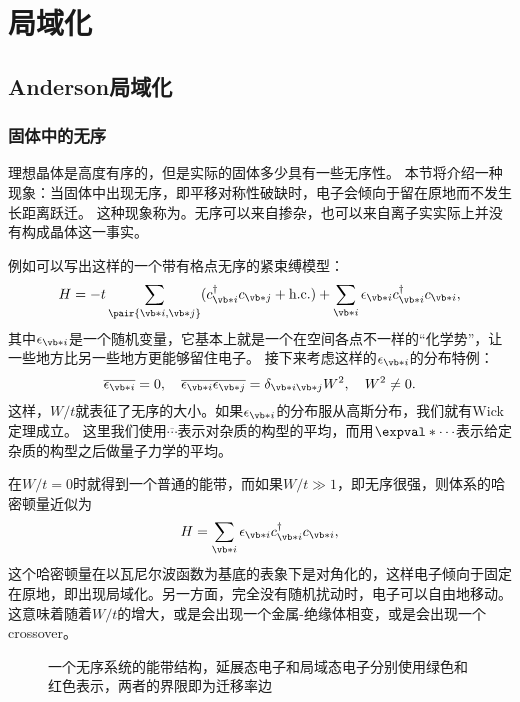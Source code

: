 \chapter{局域化}

\section{Anderson局域化}

\subsection{固体中的无序}

理想晶体是高度有序的，但是实际的固体多少具有一些无序性。
本节将介绍一种现象：当固体中出现无序，即平移对称性破缺时，电子会倾向于留在原地而不发生长距离跃迁。
这种现象称为。无序可以来自掺杂，也可以来自离子实实际上并没有构成晶体这一事实。

例如可以写出这样的一个带有格点无序的紧束缚模型：
\begin{equation}
    {H} = - t \sum_{\pair{\vb*{i}, \vb*{j}}} ({c}_{\vb*{i}}^\dagger {c}_{\vb*{j}} + \text{h.c.}) + \sum_{\vb*{i}} \epsilon_{\vb*{i}} {c}_{\vb*{i}}^\dagger {c}_{\vb*{i}},
    \label{eq:tight-binding-with-disorder}
\end{equation}
其中$\epsilon_{\vb*{i}}$是一个随机变量，它基本上就是一个在空间各点不一样的“化学势”，让一些地方比另一些地方更能够留住电子。
接下来考虑这样的$\epsilon_{\vb*{i}}$的分布特例：
\begin{equation}
    \overline{\epsilon_{\vb*{i}}} = 0, \quad \overline{\epsilon_{\vb*{i}} \epsilon_{\vb*{j}}} = \delta_{\vb*{i} \vb*{j}} W^2 , \quad W^2 \neq 0.
\end{equation}
这样，$W/t$就表征了无序的大小。如果$\epsilon_{\vb*{i}}$的分布服从高斯分布，我们就有Wick定理成立。
这里我们使用$\overline{\cdots}$表示对杂质的构型的平均，而用$\expval*{\cdots}$表示给定杂质的构型之后做量子力学的平均。

在$W/t=0$时就得到一个普通的能带，而如果$W/t \gg 1$，即无序很强，则体系的哈密顿量近似为
\[
    {H} = \sum_{\vb*{i}} \epsilon_{\vb*{i}} {c}_{\vb*{i}}^\dagger {c}_{\vb*{i}},
\]
这个哈密顿量在以瓦尼尔波函数为基底的表象下是对角化的，这样电子倾向于固定在原地，即出现局域化。另一方面，完全没有随机扰动时，电子可以自由地移动。
这意味着随着$W/t$的增大，或是会出现一个金属-绝缘体相变，或是会出现一个crossover。

\begin{figure}
    \centering
    
    \caption{一个无序系统的能带结构，延展态电子和局域态电子分别使用绿色和红色表示，两者的界限即为迁移率边}
    \label{fig:disorder-band}
\end{figure}

